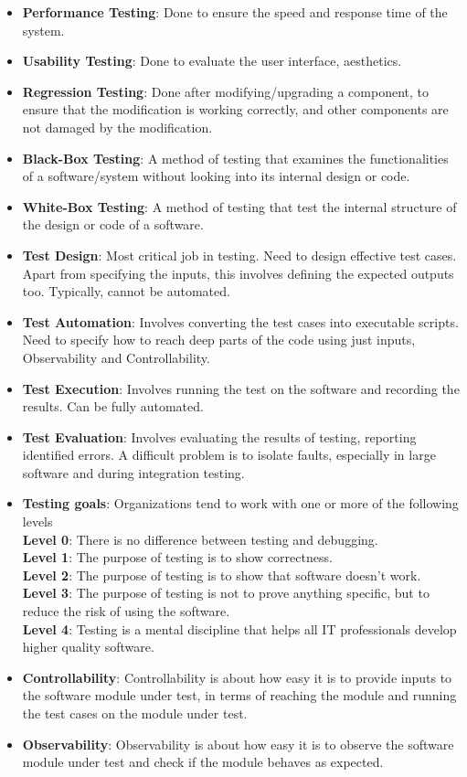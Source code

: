 \documentclass[a4paper]{article}
\begin{document}
\begin{itemize}
    \item \textbf{Performance Testing}: Done to ensure the speed and response time of the system.
    \item \textbf{Usability Testing}: Done to evaluate the user interface, aesthetics.
    \item \textbf{Regression Testing}: Done after modifying/upgrading a component, to ensure that the modification is working correctly, and other components are not damaged by the modification.
    \item \textbf{Black-Box Testing}: A method of testing that examines the functionalities of a software/system without looking into its internal design or code.
    \item \textbf{White-Box Testing}: A method of testing that test the internal structure of the design or code of a software.
    \item \textbf{Test Design}: Most critical job in testing. Need to design effective test cases. Apart from specifying the inputs, this involves defining the expected outputs too. Typically, cannot be automated.
    \item \textbf{Test Automation}: Involves converting the test cases into executable scripts. Need to specify how to reach deep parts of the code using just inputs, Observability and Controllability.
    \item \textbf{Test Execution}: Involves running the test on the software and recording the results. Can be fully automated.
    \item \textbf{Test Evaluation}: Involves evaluating the results of testing, reporting identified errors. A difficult problem is to isolate faults, especially in large software and during integration testing.
    \item \textbf{Testing goals}: Organizations tend to work with one or more of the following levels\\
    \textbf{Level 0}: There is no difference between testing and debugging.\\
    \textbf{Level 1}: The purpose of testing is to show correctness.\\
    \textbf{Level 2}: The purpose of testing is to show that software doesn't work.\\
    \textbf{Level 3}: The purpose of testing is not to prove anything specific, but to reduce the risk of using the software.\\
    \textbf{Level 4}: Testing is a mental discipline that helps all IT professionals develop higher quality software.
    \item \textbf{Controllability}: Controllability is about how easy it is to provide inputs to the software module under test, in terms of reaching the module and running the test cases on the module under test.
    \item \textbf{Observability}: Observability is about how easy it is to observe the software module under test and check if the module behaves as expected.
\end{itemize}
\end{document}

